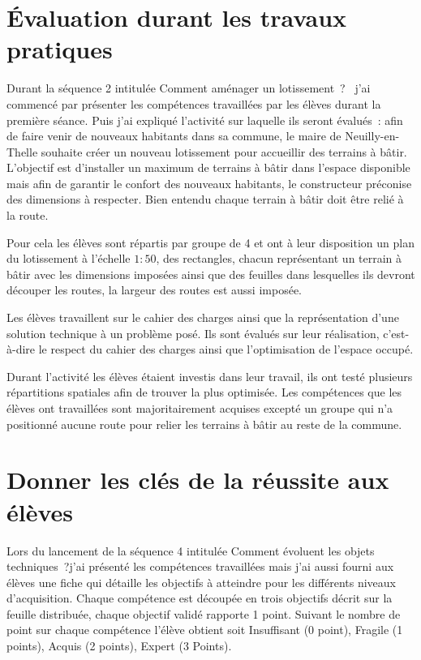 

\section{Évaluation durant les travaux pratiques}

Durant la séquence 2 intitulée \og Comment aménager un lotissement~? \fg \ j'ai commencé par présenter les compétences travaillées par les élèves durant la première séance.
Puis j'ai expliqué l'activité sur laquelle ils seront évalués~: afin de faire venir de nouveaux habitants dans sa commune, le maire de Neuilly-en-Thelle souhaite créer un nouveau lotissement pour accueillir des terrains à bâtir.
L'objectif est d'installer un maximum de terrains à bâtir dans l'espace disponible mais afin de garantir le confort des nouveaux habitants, le constructeur préconise des dimensions à respecter.
Bien entendu chaque terrain à bâtir doit être relié à la route.

Pour cela les élèves sont répartis par groupe de 4 et ont à leur disposition un plan du lotissement à l'échelle $1:50$, des rectangles, chacun représentant un terrain à bâtir avec les dimensions imposées ainsi que des feuilles dans lesquelles ils devront découper les routes, la largeur des routes est aussi imposée.

Les élèves travaillent sur le cahier des charges ainsi que la représentation d'une solution technique à un problème posé.
Ils sont évalués sur leur réalisation, c'est-à-dire le respect du cahier des charges ainsi que l'optimisation de l'espace occupé.

Durant l'activité les élèves étaient investis dans leur travail, ils ont testé plusieurs répartitions spatiales afin de trouver la plus optimisée.
Les compétences que les élèves ont travaillées sont majoritairement acquises excepté un groupe qui n'a positionné aucune route pour relier les terrains à bâtir au reste de la commune.



\section{Donner les clés de la réussite aux élèves}

Lors du lancement de la séquence 4 intitulée \og Comment évoluent les objets techniques~?\fg j'ai présenté les compétences travaillées mais j'ai aussi fourni aux élèves une fiche qui détaille les objectifs à atteindre pour les différents niveaux d'acquisition. 
Chaque compétence est découpée en trois objectifs décrit sur la feuille distribuée, chaque objectif validé rapporte 1 point. Suivant le nombre de point sur chaque compétence l'élève obtient soit Insuffisant (0 point), Fragile (1 points), Acquis (2 points), Expert (3 Points).


